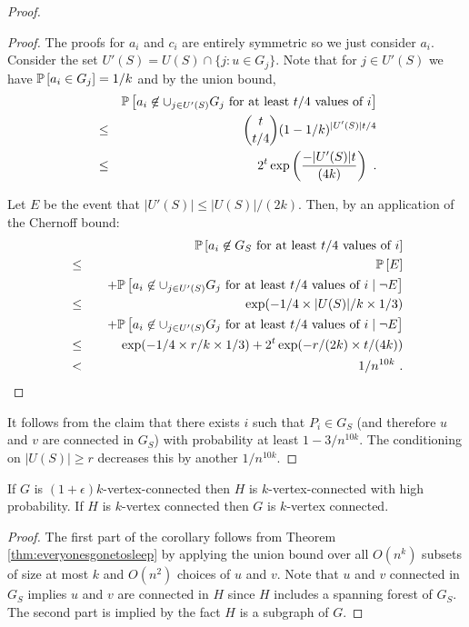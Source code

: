 \begin{proof}
\begin{proof}
The proofs for $a_i$ and $c_i$ are entirely symmetric so we just consider $a_i$. 
Consider the set $U'(S)=U(S)\cap \{j: u\in G_j\}$. Note that for $j\in U'(S)$ we have
$\mathbb P \left [ a_i\in G_j \right ]=1/k$ and by the union bound,
\begin{eqnarray*}
& & \mathbb P \left [ a_i\not \in \cup_{j\in U'(S)}G_j \mbox{ for at least $t/4$ values of $i$} \right ]\\
& \leq & {t \choose t/4} (1-1/k)^{|U'(S)|  t/4} \\
& \leq & 2^t \exp \left (\frac{-|U'(S)|  t}{(4k)}\right )
\ .
\end{eqnarray*}

Let $E$ be the event that $|U'(S)|\leq |U(S)|/(2k)$. Then, by an application of the Chernoff bound:
\begin{eqnarray*}
& & \mathbb P \left [ a_i\not \in G_S \mbox{ for at least $t/4$ values of $i$} \right ] \\
& \leq &
\mathbb P \left [ E \right ]   \\
& & + \mathbb P \left [ a_i\not \in \cup_{j\in U'(S)}G_j  \mbox{ for at least $t/4$ values of $i$} \mid \neg E \right ] \\
& \leq &
\exp(-1/4 \times |U(S)|/k \times 1/3)   \\
& & \quad + \mathbb P \left [ a_i\not \in \cup_{j\in U'(S)}G_j  \mbox{ for at least $t/4$ values of $i$} \mid \neg E \right ] \\
& \leq &
\exp(-1/4 \times r/k \times 1/3) +2^t \exp(-r/(2k)\times  t/(4k)) \\
&<&  1/n^{10k}\ .
\end{eqnarray*}
\end{proof}
It follows from the claim that there exists $i$ such that $P_i\in G_S$ (and therefore $u$ and $v$ are connected in $G_S$) with probability at least $1-3/n^{10k}$. The conditioning on $|U(S)|\geq r$ decreases this by another $1/n^{10k}$.
\end{proof}

\begin{corollary}
If $G$ is $(1+\epsilon)k$-vertex-connected then $H$ is $k$-vertex-connected with high probability. If $H$ is  $k$-vertex connected then $G$ is $k$-vertex connected.
\end{corollary}
\begin{proof}
The first part of the corollary follows from Theorem \ref{thm:everyonesgonetosleep} by applying the union bound over all $O(n^k)$ subsets of size at most $k$ and $O(n^2)$ choices of $u$ and $v$. Note that $u$ and $v$  connected in $G_S$ implies $u$ and $v$ are connected in $H$ since $H$ includes a spanning forest of $G_S$. The second part  is implied by the fact $H$ is a subgraph of $G$.
\end{proof}

